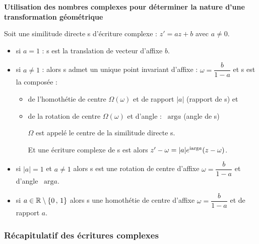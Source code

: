 \bigskip

 \textbf{ Utilisation des nombres complexes pour
déterminer la nature d'une transformation
géométrique}
 
 \begin{theorem}
Soit  une similitude directe s d'écriture   complexe : $z' = a z + b$ avec  $a \neq 0$.

\begin{itemize}
\item   si $a = 1$ : s est la translation de vecteur  d'affixe $ b $. 
\item si $ a\neq 1 $ : alors s admet un unique point invariant  d'affixe : $ \omega=\dfrac{b}{1-a} $  et s est la composée :
\begin{itemize}
\item de l'homothétie de centre  $ \Omega(\omega) $ et de rapport $ |a| $ (rapport de s) et
\item de la rotation de centre  $ \Omega(\omega) $ et d'angle : \, $ \text{arg} a $ (angle de s)

 $\Omega $ est appelé le centre de la similitude directe s.
 
 Et une écriture complexe de s est alors $ z'-\omega =|a|e^{\text{i} \text{arg} a}(z-\omega) $.
\end{itemize}
\item  si $ |a|=1 $ et $ a\neq 1 $ alors  s est une  rotation de centre d'affixe  $ \omega=\dfrac{b}{1-a} $ et d'angle   \, $ \text{arg} a $.
\item  si $ a\in\mathbb{R} \setminus \left\{0\, , \,1\right\}$ alors s une homothétie de centre d'affixe  $ \omega=\dfrac{b}{1-a} $ et de rapport $ a $.
\end{itemize}
 \end{theorem}
\subsubsection*{Récapitulatif des écritures complexes}

